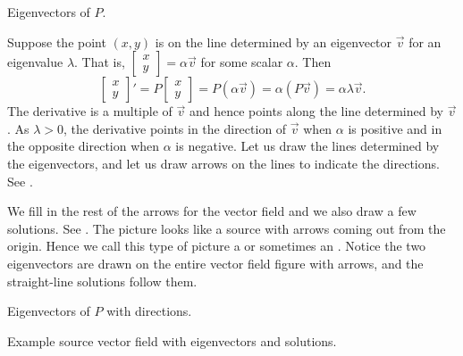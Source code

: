 \documentclass{ximera}
\begin{document}
\begin{mywrapfig}{3.25in}
    \capstart
    \caption{Eigenvectors of $P$.\label{pln:source-eigfig}}
\end{mywrapfig}

Suppose the point $(x,y)$ is on the line determined by an eigenvector $\vec{v}$ for an eigenvalue $\lambda$. That is, $\left[ \begin{smallmatrix} x \\ y \end{smallmatrix} \right] = \alpha \vec{v}$ for some scalar $\alpha$. Then 
\begin{equation*}
    \begin{bmatrix} 
        x \\ 
        y 
    \end{bmatrix} '
    = P 
    \begin{bmatrix} 
        x \\ 
        y 
    \end{bmatrix}
    = P ( \alpha \vec{v} ) =  \alpha ( P \vec{v} ) = \alpha \lambda \vec{v} .
\end{equation*}
The derivative is a multiple of $\vec{v}$ and hence points along the line determined by $\vec{v}$.  As $\lambda > 0$, the derivative points in the direction of $\vec{v}$ when $\alpha$ is positive and in the opposite direction when $\alpha$ is negative.  Let us draw the lines determined by the eigenvectors, and let us draw arrows on the lines to indicate the directions. See .

We fill in the rest of the arrows for the vector field and we also draw a few solutions.  See . The picture looks like a source with arrows coming out from the origin. Hence we call this type of picture a \emph{} or sometimes an \emph{}. Notice the two eigenvectors are drawn on the entire vector field figure with arrows, and the straight-line solutions follow them.  

\begin{myfig}
    \parbox[t]{3.0in}{
    \capstart
    \caption{Eigenvectors of $P$ with directions.\label{pln:source-eig-arrfig}}}
    \quad \parbox[t]{3.0in}{
    \capstart
    \caption{Example source vector field with eigenvectors and solutions.\label{pln:source-fullfig}}}
\end{myfig}
\end{document}
